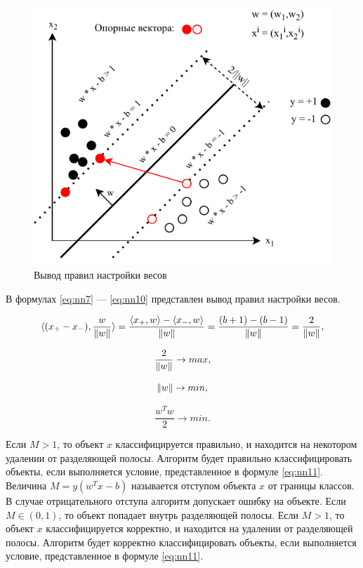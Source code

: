 \begin{figure}[H]
	\centering
	\includegraphics[width=\textwidth]{../img/svm2.pdf}
	\caption{Вывод правил настройки весов}
	\label{fig:svm2}
\end{figure}

В формулах \ref{eq:nn7} --- \ref{eq:nn10} представлен вывод правил настройки весов.

\begin{equation}
	\label{eq:nn7}
	\langle(x_+-x_-),\frac{w}{\Arrowvert w\Arrowvert}\rangle = \frac{\langle x_+,w\rangle - \langle x_-,w\rangle}{\Arrowvert w\Arrowvert} = \frac{(b+1)-(b-1)}{\Arrowvert w\Arrowvert} = \frac{2}{\Arrowvert w\Arrowvert},
\end{equation}

\begin{equation}
	\label{eq:nn8}
	\frac{2}{\Arrowvert w\Arrowvert} \rightarrow max,
\end{equation}

\begin{equation}
	\label{eq:nn9}
	\Arrowvert w\Arrowvert \rightarrow min,
\end{equation}

\begin{equation}
	\label{eq:nn10}
	\frac{w^Tw}{2} \rightarrow min.
\end{equation}

 Если $M > 1$, то объект $x$ классифицируется правильно, и находится на некотором удалении от разделяющей полосы. Алгоритм будет правильно классифицировать объекты, если выполняется условие, представленное в формуле \ref{eq:nn11}.
Величина $M=y(w^Tx-b)$ называется отступом объекта $x$ от границы классов. В случае отрицательного отступа алгоритм допускает ошибку на объекте. Если $M \in (0, 1)$,
то объект попадает внутрь разделяющей полосы. Если $M > 1$, то объект $x$ классифицируется корректно, и находится на удалении от разделяющей полосы. Алгоритм будет корректно классифицировать объекты, если выполняется условие, представленное в формуле \ref{eq:nn11}.

